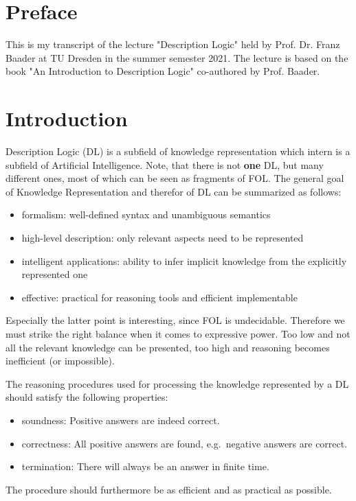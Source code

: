 \setcounter{chapter}{-1}
\chapter{Preface}
This is my transcript of the lecture "Description Logic" held by Prof. Dr. Franz Baader at TU Dresden in the summer semester 2021.
The lecture is based on the book "An Introduction to Description Logic" \cite{baader_dl_17} co-authored by Prof. Baader.

\chapter{Introduction}
Description Logic (DL) is a subfield of knowledge representation which intern is a subfield of Artificial Intelligence.
Note, that there is not \textbf{one} DL, but many different ones, most of which can be seen as fragments of FOL.
The general goal of Knowledge Representation and therefor of DL can be summarized as follows:
\begin{itemize}
	\item formalism: well-defined syntax and unambiguous semantics
	\item high-level description: only relevant aspects need to be represented
	\item intelligent applications: ability to infer implicit knowledge from the explicitly represented one
	\item effective: practical for reasoning tools and efficient implementable
\end{itemize}
Especially the latter point is interesting, since FOL is undecidable.
Therefore we must strike the right balance when it comes to expressive power.
Too low and not all the relevant knowledge can be presented, too high and reasoning becomes inefficient (or impossible).

The reasoning procedures used for processing the knowledge represented by a DL should satisfy the following properties:
\begin{itemize}
	\item soundness: Positive answers are indeed correct. 
	\item correctness: All positive answers are found, e.g.\ negative answers are correct.
	\item termination: There will always be an answer in finite time.
\end{itemize}
The procedure should furthermore be as efficient and as practical as possible.


